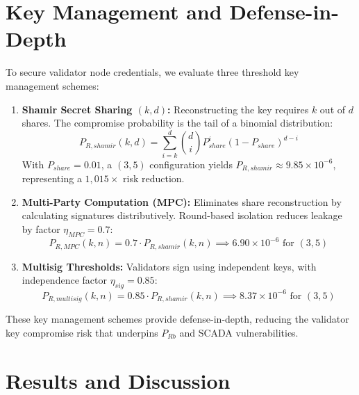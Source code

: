 \documentclass[10pt,twocolumn,journal]{IEEEtran}
\begin{document}
\section{Key Management and Defense-in-Depth}
\label{sec:key_management}

To secure validator node credentials, we evaluate three threshold key management schemes:

\begin{enumerate}[leftmargin=*]
    \item \textbf{Shamir Secret Sharing $(k,d)$:} Reconstructing the key requires $k$ out of $d$ shares. The compromise probability is the tail of a binomial distribution:
    \begin{equation}
    P_{R,shamir}(k,d) = \sum_{i=k}^{d} \binom{d}{i} P_{share}^i (1 - P_{share})^{d-i}
    \end{equation}
    With $P_{share} = 0.01$, a $(3,5)$ configuration yields $P_{R,shamir} \approx 9.85 \times 10^{-6}$, representing a $1,015\times$ risk reduction.

    \item \textbf{Multi-Party Computation (MPC):} Eliminates share reconstruction by calculating signatures distributively. Round-based isolation reduces leakage by factor $\eta_{MPC} = 0.7$:
    \begin{equation}
    P_{R,MPC}(k,n) = 0.7 \cdot P_{R,shamir}(k,n) \implies 6.90 \times 10^{-6} \text{ for } (3,5)
    \end{equation}

    \item \textbf{Multisig Thresholds:} Validators sign using independent keys, with independence factor $\eta_{sig} = 0.85$:
    \begin{equation}
    P_{R,multisig}(k,n) = 0.85 \cdot P_{R,shamir}(k,n) \implies 8.37 \times 10^{-6} \text{ for } (3,5)
    \end{equation}
\end{enumerate}

These key management schemes provide defense-in-depth, reducing the validator key compromise risk that underpins $P_{Rb}$ and SCADA vulnerabilities.

\section{Results and Discussion}
\label{sec:results_discussion}
\end{document}
